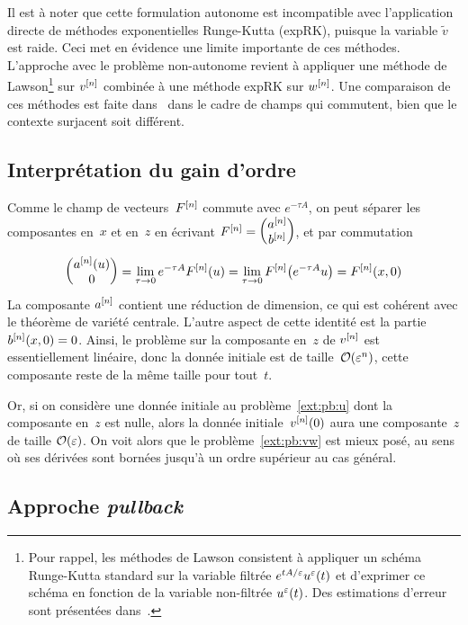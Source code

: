 Il est à noter que cette formulation autonome est incompatible avec l'application directe de méthodes exponentielles Runge-Kutta (expRK), puisque la variable $\tilde{v}$ est raide. Ceci met en évidence une limite importante de ces méthodes. L'approche avec le problème non-autonome revient à appliquer une méthode de Lawson\footnote{Pour rappel, les méthodes de Lawson consistent à appliquer un schéma Runge-Kutta standard sur la variable filtrée $e^{tA/\varepsilon} u^{\varepsilon}(t)$ et d'exprimer ce schéma en fonction de la variable non-filtrée $u^{\varepsilon}(t)$. Des estimations d'erreur sont présentées dans~\cite{hochbruck.2020.convergence}.} sur $v^{[n]}$ combinée à une méthode expRK sur $w^{[n]}$. Une comparaison de ces méthodes est faite dans~\cite{crouseilles.2020.exponential} dans le cadre de champs qui commutent, bien que le contexte surjacent soit différent.


\subsection{Interprétation du gain d'ordre}

Comme le champ de vecteurs~$F^{[n]}$ commute avec $e^{-\tau A}$, on peut séparer les composantes en~$x$ et en~$z$ en écrivant $F^{[n]} = \begin{pmatrix} a^{[n]} \\ b^{[n]} \end{pmatrix}$, et par commutation
\begin{equation*}
    \begin{pmatrix} a^{[n]}(u) \\ 0 \end{pmatrix} 
    = \lim_{\tau \rightarrow 0} e^{-\tau A} F^{[n]} (u)
    = \lim_{\tau \rightarrow 0} F^{[n]} \big( e^{-\tau A} u \big)
    = F^{[n]} (x, 0)
\end{equation*}
La composante $a^{[n]}$ contient une réduction de dimension, ce qui est cohérent avec le théorème de variété centrale. L'autre aspect de cette identité est la partie $b^{[n]}(x,0) = 0$. Ainsi, le problème sur la composante en~$z$ de $v^{[n]}$ est essentiellement linéaire, donc la donnée initiale est de taille~$\mathcal{O}(\varepsilon^n)$, cette composante reste de la même taille pour tout~$t$. 

Or, si on considère une donnée initiale au problème~\eqref{ext:pb:u} dont la composante en~$z$ est nulle, alors la donnée initiale~$v^{[n]} (0)$ aura une composante~$z$ de taille $\mathcal{O}(\varepsilon)$. On voit alors que le problème~\eqref{ext:pb:vw} est mieux posé, au sens où ses dérivées sont bornées jusqu'à un ordre supérieur au cas général. 


\subsection{Approche \textit{pullback}}


